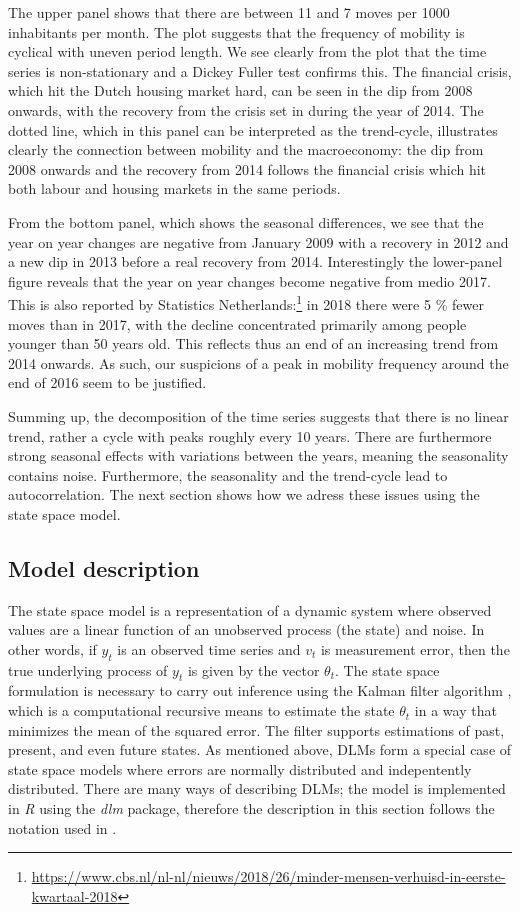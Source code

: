 \documentclass[12pt, a4paper]{article}
\begin{document}
The upper panel shows that there are between 11 and 7 moves per 1000
inhabitants per month. The plot suggests that the frequency of mobility
is cyclical with uneven period length. We see clearly from the plot that
the time series is non-stationary and a Dickey Fuller test confirms
this. The financial crisis, which hit the Dutch housing market hard, can
be seen in the dip from 2008 onwards, with the recovery from the crisis
set in during the year of 2014. The dotted line, which in this panel can
be interpreted as the trend-cycle, illustrates clearly the connection
between mobility and the macroeconomy: the dip from 2008 onwards and the
recovery from 2014 follows the financial crisis which hit both labour
and housing markets in the same periods.

From the bottom panel, which shows the seasonal differences, we see that
the year on year changes are negative from January 2009 with a recovery
in 2012 and a new dip in 2013 before a real recovery from 2014.
Interestingly the lower-panel figure reveals that the year on year
changes become negative from medio 2017. This is also reported by
Statistics
Netherlands:\footnote{\url{https://www.cbs.nl/nl-nl/nieuws/2018/26/minder-mensen-verhuisd-in-eerste-kwartaal-2018}}
in 2018 there were 5 \% fewer moves than in 2017, with the decline
concentrated primarily among people younger than 50 years old. This
reflects thus an end of an increasing trend from 2014 onwards. As such,
our suspicions of a peak in mobility frequency around the end of
2016 seem to be justified.

Summing up, the decomposition of the time series suggests that there is
no linear trend, rather a cycle with peaks roughly every 10 years. There
are furthermore strong seasonal effects with variations between the
years, meaning the seasonality contains noise. Furthermore, the
seasonality and the trend-cycle lead to autocorrelation. The next
section shows how we adress these issues using the state space model.

\subsection{Model description}\label{model-description}

The state space model is a representation of a dynamic system where observed values are a linear function of an unobserved process (the state) and noise. In other words, if $y_{t}$ is an observed time series and $v_{t}$ is measurement error, then the true underlying process of $y_{t}$ is given by the vector $\theta_{t}$. The state space formulation is necessary to carry out inference using the Kalman filter algorithm
\citep{kalman1960contributions}, which is a computational recursive means to estimate the state $\theta_{t}$ in a way that minimizes the mean of the squared error. The filter supports estimations of past, present, and even future states. As mentioned above, DLMs form a special case of state space models where errors are normally distributed and indepentently distributed. There are many ways of describing DLMs; the model
is implemented in \emph{R} using the \emph{dlm} package, therefore the
description in this section follows the notation used in
\citet{petris2009dynamic}.
\end{document}

